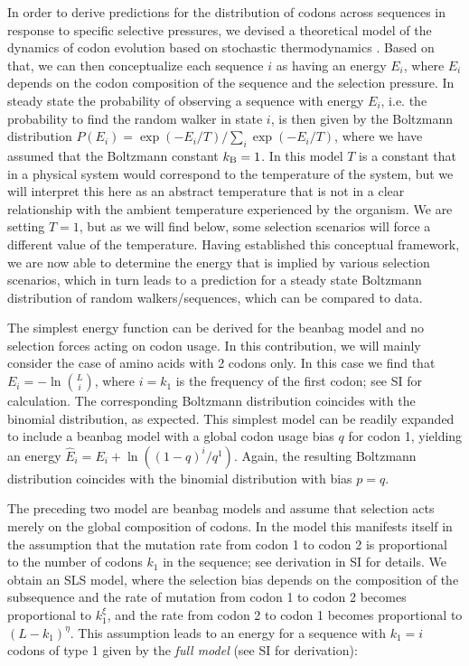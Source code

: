 \documentclass[a4paper,10pt]{paper}%
\newcommand*{\bc}{k_{\textup{B}}}
\begin{document}
\par
In order to derive  predictions for the distribution of codons across sequences in response to specific selective pressures, we devised a theoretical model of the dynamics of codon evolution based on stochastic thermodynamics \cite{seifertreview}. Based on that, we can then  conceptualize each sequence $i$ as having an energy $E_i$, where $E_i$ depends on the codon composition of the sequence and the selection pressure. In  steady state  the probability of  observing a sequence with energy $E_i$, i.e. the probability to find the random walker in state $i$,  is then  given by the Boltzmann distribution $P(E_i) = \exp(-E_i/T)/\sum_i \exp(-E_i/T)$, where we have assumed that the Boltzmann constant  $\bc=1$.  In this model  $T$ is a constant that in a physical system would correspond to the temperature of the system, but we will interpret this here as an abstract temperature that is not in a clear relationship with the ambient temperature experienced by the organism. We are setting $T=1$, but as we will find below, some selection scenarios will force a different value of the temperature.  Having established this conceptual framework, we are now able to determine the energy that is implied by various selection scenarios, which in turn  leads to a prediction for a steady state Boltzmann distribution of random walkers/sequences, which can be compared to data.
\par
The  simplest energy function can be derived for the beanbag model and   no  selection forces acting on codon usage. In this contribution, we will   mainly  consider the case of amino acids with 2 codons only.  In this  case we find that $E_i=-\ln {L\choose i}$, where $i=k_1$ is the frequency of the first codon; see SI for calculation. The corresponding Boltzmann distribution coincides with the binomial distribution, as expected. This simplest model can be readily expanded to include  a beanbag model with  a global codon usage bias $q$ for codon 1, yielding an energy  $\hat E_i = E_i  + \ln\left( (1-q)^i / q^1 \right)$. Again, the resulting Boltzmann distribution  coincides with the  binomial distribution with bias $p=q$.    
\par
The preceding two model are beanbag models and assume that selection acts merely on the global composition of codons. In the model this manifests itself in the assumption that the mutation rate from codon 1 to codon 2 is proportional to  the number of codons $k_1$ in the sequence; see derivation in SI for details. We obtain an  SLS  model, where the selection bias depends on the composition of the subsequence and  the rate of mutation  from codon 1 to codon 2 becomes  proportional to $k_1^\xi$, and  the rate from codon 2 to codon 1 becomes  proportional to $(L-k_1)^\eta$.   This  assumption leads to an energy  for a sequence with $k_1=i$ codons of type 1 given by the {\em full model}  (see SI for derivation): 
\end{document}
